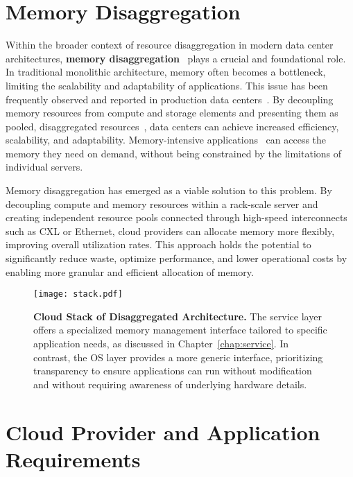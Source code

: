 \section{Memory Disaggregation}

Within the broader context of resource disaggregation in modern data center architectures, \textbf{memory disaggregation}~\cite{memdisagg1, memdisagg2, memdisagg3, memdisagg4, memdisagg5, memdisagg6} plays a crucial and foundational role. In traditional monolithic architecture, memory often becomes a bottleneck, limiting the scalability and adaptability of applications. This issue has been frequently observed and reported in production data centers~\cite{memory1, memory2, memory3, memory4, memory5, memory6, memory7, memory8, memory9, memory10}. By decoupling memory resources from compute and storage elements and presenting them as pooled, disaggregated resources~\cite{pool1, pool2}, data centers can achieve increased efficiency, scalability, and adaptability. Memory-intensive applications~\cite{redis, ramcloud, sparkmemory} can access the memory they need on demand, without being constrained by the limitations of individual servers. 

Memory disaggregation has emerged as a viable solution to this problem. By decoupling compute and memory resources within a rack-scale server and creating independent resource pools connected through high-speed interconnects such as CXL or Ethernet, cloud providers can allocate memory more flexibly, improving overall utilization rates. This approach holds the potential to significantly reduce waste, optimize performance, and lower operational costs by enabling more granular and efficient allocation of memory.

\begin{figure}[t]
    \centering
    \texttt{[image: stack.pdf]}
      \caption[Cloud Stack of Disaggregated Architecture]{\textbf{Cloud Stack of Disaggregated Architecture.} The service layer offers a specialized memory management interface tailored to specific application needs, as discussed in Chapter~\ref{chap:service}. In contrast, the OS layer provides a more generic interface, prioritizing transparency to ensure applications can run without modification and without requiring awareness of underlying hardware details.} 
      \label{fig:stack}
\end{figure}


\section{Cloud Provider and Application Requirements}

